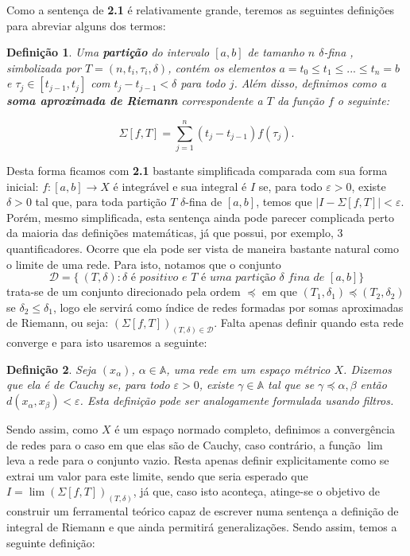 \documentclass[12pt, a4paper]{article}
\newtheorem{mydef}{Definição}[section]
\theoremstyle{definition}
\begin{document}
Como a sentença de \textbf{2.1} é relativamente grande, teremos as seguintes definições para abreviar alguns dos termos:

\begin{mydef}

Uma \textbf{partição} do intervalo $[a,b]$ de tamanho $n$ $\delta$-fina , simbolizada por $T=(n,t_i,\tau_i,\delta )$, contém os elementos $a=t_0\leq t_1\leq ... \leq t_n=b$ e $\tau_j\in [t_{j-1},t_j ]$ com $t_j-t_{j-1}<\delta$ para todo $j$. Além disso, definimos como a \textbf{soma aproximada de Riemann} correspondente a $T$ da função $f$ o seguinte:

$$\Sigma [f,T]=\sum_{j=1}^n (t_j-t_{j-1})f(\tau_j).$$

\end{mydef}

Desta forma ficamos com \textbf{2.1} bastante simplificada comparada com sua forma inicial:  $f:[a,b]\rightarrow X$ é integrável e sua integral é $I$ se, para todo $\varepsilon >0$, existe $\delta >0$ tal que, para toda partição $T$ $\delta$-fina de $[a,b]$, temos que  $\left| I-\Sigma [f,T] \right| < \varepsilon$. Porém, mesmo simplificada, esta sentença ainda pode parecer complicada perto da maioria das definições matemáticas, já que possui, por exemplo, 3 quantificadores. Ocorre que ela pode ser vista de maneira bastante natural como o limite de uma rede. Para isto, notamos que o conjunto $$\mathcal{D}=\{\ (T,\delta): \delta \textit{ é positivo e } T  \textit{ é uma partição } \delta \textit{ fina de } [a,b] \}$$ trata-se de um conjunto direcionado pela ordem $\preccurlyeq$ em que $(T_1,\delta_1)\preccurlyeq (T_2,\delta_2)$ se $\delta_2\leq \delta_1$, logo ele servirá como índice de redes formadas por somas aproximadas de Riemann, ou seja: $(\Sigma [f,T])_{(T,\delta)\in \mathcal{D}}$. Falta apenas definir quando esta rede converge e para isto usaremos a seguinte:

\begin{mydef}
	
Seja $(x_\alpha)$, $\alpha \in \mathbb{A}$, uma rede em um espaço métrico $X$. Dizemos que ela é de Cauchy se, para todo  $\varepsilon >0$, existe $\gamma \in \mathbb{A}$ tal que se $\gamma \preccurlyeq \alpha , \beta $ então $d (x_\alpha , x_\beta)<\varepsilon$. Esta definição pode ser analogamente formulada usando filtros.
	
\end{mydef}

Sendo assim, como $X$ é um espaço normado completo, definimos a convergência de redes para o caso em que elas são de Cauchy, caso contrário, a função $\lim$ leva a rede para o conjunto vazio. Resta apenas definir explicitamente como se extrai um valor para este limite, sendo que seria esperado que $I=\lim (\Sigma [f,T])_{(T,\delta)}$, já que, caso isto aconteça, atinge-se o objetivo de construir um ferramental teórico capaz de escrever numa sentença a definição de integral de Riemann e que ainda permitirá generalizações. Sendo assim, temos a seguinte definição: 
\end{document}
